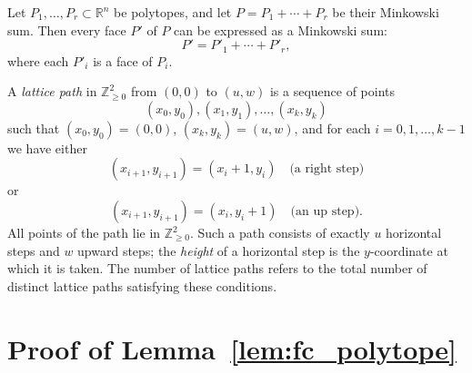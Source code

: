\begin{proposition}\label{prop:minkowski-faces}
	Let $P_1, \ldots, P_r \subset \mathbb{R}^n$ be polytopes, and let $P = P_1 + \cdots + P_r$ be their Minkowski sum. Then every face $P'$ of $P$ can be expressed as a Minkowski sum:
	\[P' = P'_1 + \cdots + P'_r,\]
	where each $P'_i$ is a face of $P_i$.
\end{proposition}

\begin{definition}\label{def:lattice_path}
	A \emph{lattice path} in $\mathbb{Z}_{\geq 0}^2$ from $(0,0)$ to $(u,w)$ is a sequence of points
	\[
	(x_0,y_0),(x_1,y_1),\ldots,(x_k,y_k)
	\]
	such that $(x_0,y_0)=(0,0)$, $(x_k,y_k)=(u,w)$, and for each $i=0,1,\ldots,k-1$ we have either
	\[
	(x_{i+1},y_{i+1})=(x_i+1,y_i)\quad\text{(a right step)}
	\]
	or
	\[
	(x_{i+1},y_{i+1})=(x_i,y_i+1)\quad\text{(an up step)}.
	\]
	All points of the path lie in $\mathbb{Z}_{\geq 0}^2$. Such a path consists of exactly $u$ horizontal steps and $w$ upward steps; the \emph{height} of a horizontal step is the $y$-coordinate at which it is taken.
	The {number of lattice paths} refers to the total number of distinct lattice paths satisfying these conditions.
\end{definition}

\newpage

\section{Proof of Lemma~\ref{lem:fc_polytope}}
\label{appendix:proof_lemma_fc}


